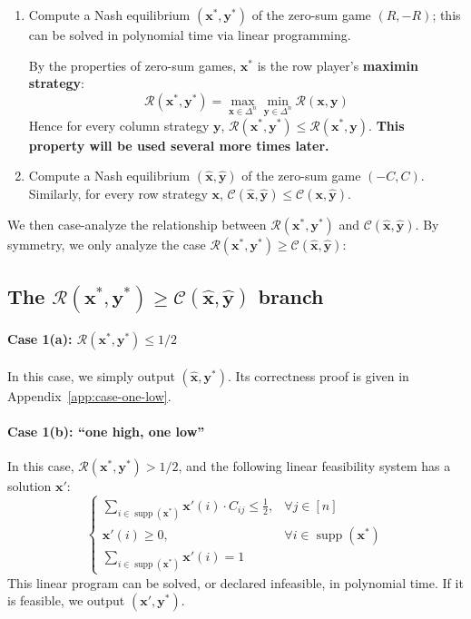 \begin{enumerate}
  \item Compute a Nash equilibrium $(\mathbf{x}^*, \mathbf{y}^*)$ of the zero-sum game $(R, -R)$; this can be solved in polynomial time via linear programming.

        By the properties of zero-sum games, $\mathbf{x}^*$ is the row player's \textbf{maximin strategy}:
        \[
          \mathcal{R}(\mathbf{x}^*, \mathbf{y}^*) = \max_{\mathbf{x} \in \Delta^n} \min_{\mathbf{y} \in \Delta^n} \mathcal{R}(\mathbf{x}, \mathbf{y})
        \]
        Hence for every column strategy $\mathbf{y}$, $\mathcal{R}(\mathbf{x}^*, \mathbf{y}^*) \le \mathcal{R}(\mathbf{x}^*, \mathbf{y})$. \textbf{This property will be used several more times later.}

  \item Compute a Nash equilibrium $(\hat{\mathbf{x}}, \hat{\mathbf{y}})$ of the zero-sum game $(-C, C)$. Similarly, for every row strategy $\mathbf{x}$, $\mathcal{C}(\hat{\mathbf{x}}, \hat{\mathbf{y}}) \le \mathcal{C}(\mathbf{x}, \hat{\mathbf{y}})$.
\end{enumerate}

We then case-analyze the relationship between $\mathcal{R}(\mathbf{x}^*, \mathbf{y}^*)$ and $\mathcal{C}(\hat{\mathbf{x}}, \hat{\mathbf{y}})$. By symmetry, we only analyze the case \textbf{$\mathcal{R}(\mathbf{x}^*, \mathbf{y}^*) \ge \mathcal{C}(\hat{\mathbf{x}}, \hat{\mathbf{y}})$}:

\subsection{The \texorpdfstring{$\mathcal{R}(\mathbf{x}^*, \mathbf{y}^*) \ge \mathcal{C}(\hat{\mathbf{x}}, \hat{\mathbf{y}})$}{R(x*,y*) >= C(xh,yh)} branch}

\paragraph{Case 1(a): $\mathcal{R}(\mathbf{x}^*, \mathbf{y}^*) \le 1/2$}
In this case, we simply output $(\hat{\mathbf{x}}, \mathbf{y}^*)$. Its correctness proof is given in Appendix~\ref{app:case-one-low}.

\paragraph{Case 1(b): ``one high, one low''}
In this case, $\mathcal{R}(\mathbf{x}^*, \mathbf{y}^*) > 1/2$, and the following linear feasibility system has a solution $\mathbf{x}'$:
\[
  \begin{cases}
    \sum_{i \in \operatorname{supp}(\mathbf{x}^*)} \mathbf{x}'(i) \cdot C_{ij} \le \frac12, & \forall j \in [n]                               \\[4pt]
    \mathbf{x}'(i) \ge 0,                                                                   & \forall i \in \operatorname{supp}(\mathbf{x}^*) \\[4pt]
    \sum_{i \in \operatorname{supp}(\mathbf{x}^*)} \mathbf{x}'(i) = 1
  \end{cases}
\]
This linear program can be solved, or declared infeasible, in polynomial time.
If it is feasible, we output $(\mathbf{x}', \mathbf{y}^*)$.

